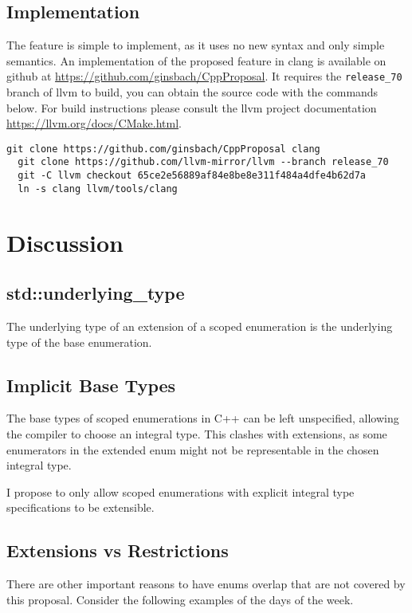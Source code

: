 \documentclass{scrartcl}
\begin{document}
\subsection{Implementation}
The feature is simple to implement, as it uses no new syntax and only simple semantics.
An implementation of the proposed feature in clang is available on github at \url{https://github.com/ginsbach/CppProposal}.
It requires the \texttt{release\_70} branch of llvm to build, you can obtain the source code with the commands below.
For build instructions please consult the llvm project documentation \url{https://llvm.org/docs/CMake.html}.

{\footnotesize
\begin{lstlisting}[language={}]
  git clone https://github.com/ginsbach/CppProposal clang
  git clone https://github.com/llvm-mirror/llvm --branch release_70
  git -C llvm checkout 65ce2e56889af84e8be8e311f484a4dfe4b62d7a
  ln -s clang llvm/tools/clang
\end{lstlisting}}

\section{Discussion}
\subsection{std::underlying\_type}
The underlying type of an extension of a scoped enumeration is the underlying type of the base enumeration.

\subsection{Implicit Base Types}
The base types of scoped enumerations in C++ can be left unspecified, allowing
the compiler to choose an integral type.
This clashes with extensions, as some enumerators in the extended enum might not
be representable in the chosen integral type.

I propose to only allow scoped enumerations with explicit integral type
specifications to be extensible.

\subsection{Extensions vs Restrictions}
There are other important reasons to have enums overlap that are not covered by this proposal.
Consider the following examples of the days of the week.
\end{document}

